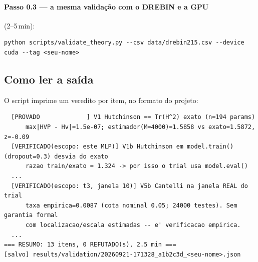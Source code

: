 \paragraph{Passo 0.3 --- a mesma validação com o DREBIN e a GPU} (2--5\,min):
\begin{lstlisting}
python scripts/validate_theory.py --csv data/drebin215.csv --device cuda --tag <seu-nome>
\end{lstlisting}

\subsection{Como ler a saída}
O script imprime um veredito por item, no formato do projeto:
\begin{lstlisting}
  [PROVADO             ] V1 Hutchinson == Tr(H^2) exato (n=194 params)
      max|HVP - Hv|=1.5e-07; estimador(M=4000)=1.5858 vs exato=1.5872, z=-0.09
  [VERIFICADO(escopo: este MLP)] V1b Hutchinson em model.train() (dropout=0.3) desvia do exato
      razao train/exato = 1.324 -> por isso o trial usa model.eval()
  ...
  [VERIFICADO(escopo: t3, janela 10)] V5b Cantelli na janela REAL do trial
      taxa empirica=0.0087 (cota nominal 0.05; 24000 testes). Sem garantia formal
      com localizacao/escala estimadas -- e' verificacao empirica.
  ...
=== RESUMO: 13 itens, 0 REFUTADO(s), 2.5 min ===
[salvo] results/validation/20260921-171328_a1b2c3d_<seu-nome>.json
\end{lstlisting}

